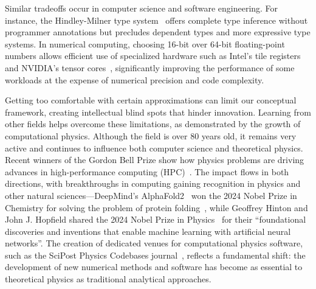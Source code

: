 Similar tradeoffs occur in computer science and software engineering. For instance, the Hindley-Milner type system~\cite{Hindle_1969_The_Principal_T,Milner_1978_A_theory_of_typ} offers complete type inference without programmer annotations but precludes dependent types and more expressive type systems. In numerical computing, choosing 16-bit over 64-bit floating-point numbers allows efficient use of specialized hardware such as Intel's tile registers~\cite{Intel_AMX} and NVIDIA's tensor cores~\cite{NvidiaTensorCores}, significantly improving the performance of some workloads at the expense of numerical precision and code complexity.

Getting too comfortable with certain approximations can limit our conceptual framework, creating intellectual blind spots that hinder innovation. Learning from other fields helps overcome these limitations, as demonstrated by the growth of computational physics. Although the field is over 80 years old, it remains very active and continues to influence both computer science and theoretical physics. Recent winners of the Gordon Bell Prize show how physics problems are driving advances in high-performance computing (HPC)~\cite{Stocks_2024_Breaking_the_Mi,Das_S_2023_Large_Scale_Mat,Fedeli_2022_Pushing_the_Fro,Liu_Y_2021_Closing_the_qu}. The impact flows in both directions, with breakthroughs in computing gaining recognition in physics and other natural sciences---DeepMind's AlphaFold2~\cite{Jumper_2021_Highly_accurate} won the 2024 Nobel Prize in Chemistry for solving the problem of protein folding~, while Geoffrey Hinton and John J. Hopfield shared the 2024 Nobel Prize in Physics~ for their ``foundational discoveries and inventions that enable machine learning with artificial neural networks''. The creation of dedicated venues for computational physics software, such as the SciPost Physics Codebases journal~, reflects a fundamental shift: the development of new numerical methods and software has become as essential to theoretical physics as traditional analytical approaches.

